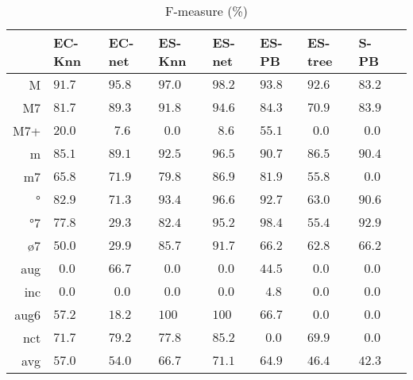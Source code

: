 \documentclass{article}
\begin{document}
\begin{table}
  \centering
\begin{tabular}{r|p{0.5cm}p{0.5cm}p{0.5cm}p{0.5cm}p{0.5cm}p{0.5cm}p{0.5cm}p{0.5cm}}
     &   EC-Knn &   EC-net &   ES-Knn &   ES-net &    ES-PB &  ES-tree &        S-PB \\ \hline
   M & $  91.7$ & $  95.8$ & $  97.0$ & $  98.2$ & $  93.8$ & $  92.6$ & $  83.2$ \\
  M7 & $  81.7$ & $  89.3$ & $  91.8$ & $  94.6$ & $  84.3$ & $  70.9$ & $  83.9$ \\
 M7+ & $  20.0$ & $ ~~7.6$ & $ ~~0.0$ & $ ~~8.6$ & $  55.1$ & $ ~~0.0$ & $ ~~0.0$ \\
   m & $  85.1$ & $  89.1$ & $  92.5$ & $  96.5$ & $  90.7$ & $  86.5$ & $  90.4$ \\
  m7 & $  65.8$ & $  71.9$ & $  79.8$ & $  86.9$ & $  81.9$ & $  55.8$ & $ ~~0.0$ \\
   ° & $  82.9$ & $  71.3$ & $  93.4$ & $  96.6$ & $  92.7$ & $  63.0$ & $  90.6$ \\
  °7 & $  77.8$ & $  29.3$ & $  82.4$ & $  95.2$ & $  98.4$ & $  55.4$ & $  92.9$ \\
  ø7 & $  50.0$ & $  29.9$ & $  85.7$ & $  91.7$ & $  66.2$ & $  62.8$ & $  66.2$ \\
 aug & $ ~~0.0$ & $  66.7$ & $ ~~0.0$ & $ ~~0.0$ & $  44.5$ & $ ~~0.0$ & $ ~~0.0$ \\
 inc & $ ~~0.0$ & $ ~~0.0$ & $ ~~0.0$ & $ ~~0.0$ & $ ~~4.8$ & $ ~~0.0$ & $ ~~0.0$ \\
aug6 & $  57.2$ & $  18.2$ & $ 100  $ & $ 100  $ & $  66.7$ & $ ~~0.0$ & $ ~~0.0$ \\
 nct & $  71.7$ & $  79.2$ & $  77.8$ & $  85.2$ & $ ~~0.0$ & $  69.9$ & $ ~~0.0$ \\
\hline                                                       
 avg & $  57.0$ & $  54.0$ & $  66.7$ & $  71.1$ & $  64.9$ & $  46.4$ & $  42.3$ \\
\end{tabular}


  \caption{F-measure (\%)}
  \label{tab:f-measure}
\end{table}
\end{document}
